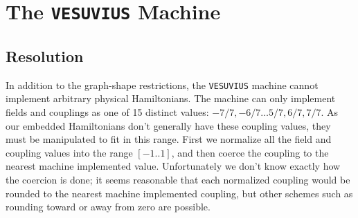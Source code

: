 \chapter{The \texttt{VESUVIUS} Machine}

\section{Resolution}
In addition to the graph-shape restrictions, the \texttt{VESUVIUS} machine cannot implement arbitrary physical Hamiltonians.  The machine can only implement fields and couplings as one of 15 distinct values: $-7/7, -6/7 \dots 5/7,6/7, 7/7$.  As our embedded Hamiltonians don't generally have these coupling values, they must be manipulated to fit in this range.
First we normalize all the field and coupling values into the range $[-1..1]$, and then coerce the coupling to the nearest machine implemented value.
Unfortunately we don't know exactly how the coercion is done; it seems reasonable that each normalized coupling would be rounded to the nearest machine implemented coupling, but other schemes such as rounding toward or away from zero are possible.
